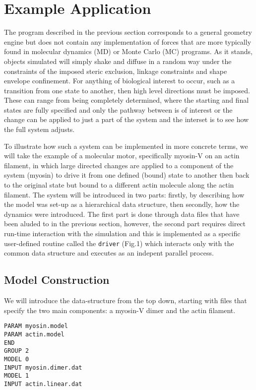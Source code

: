 \section{Example Application}

The program described in the previous section corresponds to a general
geometry engine but does not contain any implementation of forces that
are more typically found in molecular dynamics (MD) or Monte Carlo (MC)
programs.  As it stands, objects simulated will simply shake and diffuse
in a random way under the constraints of the imposed steric exclusion,
linkage constraints and shape envelope confinement.  For anything of
biological interest to occur,  such as a transition from one state to
another, then high level directions must be imposed.   These can range
from being completely determined, where the starting and final states
are fully specified and only the pathway between is of interest or
the change can be applied to just a part of the system and the interset
is to see how the full system adjusts.

To illustrate how such a system can be implemented in more concrete
terms, we will take the example of a molecular motor, specifically
myosin-V on an actin filament, in which large directed changes are
applied to a component of the system (myosin)  to drive it from one
defined (bound) state to another then back to the original state but
bound to a different actin molecule along the actin filament.  The 
system will be introduced in two parts: firstly, by describing how the
model was set-up as a hierarchical data structure, then secondly, how
the dynamics were introduced.   The first part is done through data
files that have been aluded to in the previous section, however, the
second part requires direct run-time interaction with the simulation
and this is implemented as a specific user-defined routine called
the {\tt driver} (Fig.1) which interacts only with the common data
structure and executes as an indepent parallel process.

\subsection{Model Construction}

We will introduce the data-structure from the top down, starting 
with files that specify the two main components: a myosin-V dimer
and the actin filament.

\begin{verbatim}
PARAM myosin.model
PARAM actin.model
END
GROUP 2
MODEL 0
INPUT myosin.dimer.dat
MODEL 1
INPUT actin.linear.dat
\end{verbatim}

